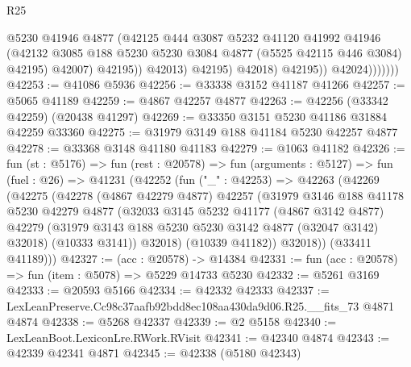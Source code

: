 \begin{lexlean}{R25}
\begin{coremodule}
                                @5230
                                @41946
                                @4877
                                (@42125
                                  @444
                                  @3087
                                  @5232
                                  @41120
                                  @41992
                                  @41946
                                  (@42132
                                    @3085
                                    @188
                                    @5230
                                    @5230
                                    @3084
                                    @4877
                                    (@5525 @42115 @446 @3084)
                                    @42195)
                                  @42007)
                                @42195))
                            @42013)
                          @42195)
                        @42018)
                      @42195))
                  @42024)))))))
@42253 := @41086 @5936
@42256 := @33338 @3152 @41187 @41266
@42257 := @5065 @41189
@42259 := @4867 @42257 @4877
@42263 := @42256 (@33342 @42259) (@20438 @41297)
@42269 := @33350 @3151 @5230 @41186 @31884 @42259 @33360
@42275 := @31979 @3149 @188 @41184 @5230 @42257 @4877
@42278 := @33368 @3148 @41180 @41183
@42279 := @1063 @41182
@42326 := fun (st : @5176) =>
  fun (rest : @20578) =>
  fun (arguments : @5127) =>
  fun (fuel : @26) =>
  @41231
    (@42252
      (fun ("_" : @42253) =>
      @42263
        (@42269
          (@42275
            (@42278
              (@4867 @42279 @4877)
              @42257
              (@31979
                @3146
                @188
                @41178
                @5230
                @42279
                @4877
                (@32033
                  @3145
                  @5232
                  @41177
                  (@4867 @3142 @4877)
                  @42279
                  (@31979 @3143 @188 @5230 @5230 @3142 @4877 (@32047 @3142) @32018)
                  (@10333 @3141))
                @32018)
              (@10339 @41182))
            @32018))
        (@33411 @41189)))
@42327 := (acc : @20578) -> @14384
@42331 := fun (acc : @20578) => fun (item : @5078) => @5229 @14733 @5230
@42332 := @5261 @3169
@42333 := @20593 @5166
@42334 := @42332 @42333
@42337 := LexLeanPreserve.Cc98c37aafb92bdd8ec108aa430da9d06.R25.__fits_73 @4871 @4874
@42338 := @5268 @42337
@42339 := @2 @5158
@42340 := LexLeanBoot.LexiconLre.RWork.RVisit
@42341 := @42340 @4874
@42343 := @42339 @42341 @4871
@42345 := @42338 (@5180 @42343)

\end{coremodule}
\end{lexlean}

